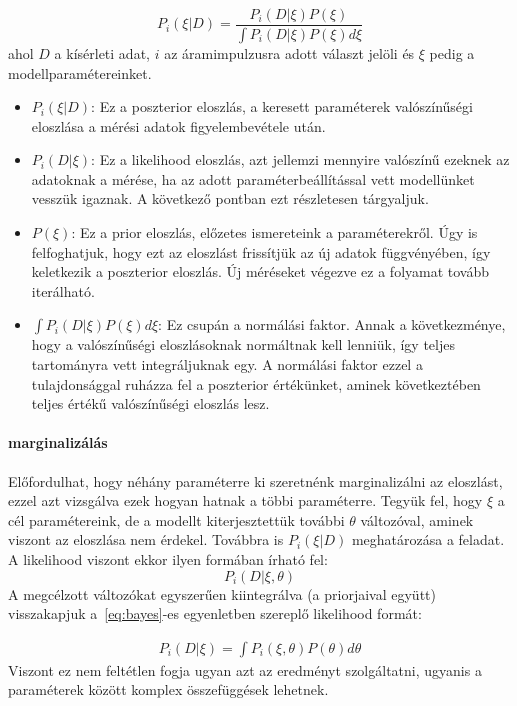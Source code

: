 \begin{equation}\label{eq:bayes}
P_i(\xi|D) = \dfrac{P_i(D|\xi)P(\xi)}{\int P_i(D|\xi)P(\xi)d\xi}
\end{equation}
ahol $D$ a kísérleti adat, $i$ az áramimpulzusra adott választ jelöli és $\xi$ pedig a modellparamétereinket.
\begin{itemize}
	\item $P_i(\xi|D)$: Ez a poszterior eloszlás, a keresett paraméterek valószínűségi eloszlása a mérési adatok figyelembevétele után.
	\item $P_i(D|\xi)$: Ez a likelihood eloszlás, azt jellemzi mennyire valószínű ezeknek az adatoknak a mérése, ha az adott paraméterbeállítással vett modellünket vesszük igaznak. A következő pontban ezt részletesen tárgyaljuk.
	\item $P(\xi)$: Ez a prior eloszlás, előzetes ismereteink a paraméterekről. Úgy is felfoghatjuk, hogy ezt az eloszlást frissítjük az új adatok függvényében, így keletkezik a poszterior eloszlás. Új méréseket végezve ez a folyamat tovább iterálható.
	\item $\int P_i(D|\xi)P(\xi)d\xi$: Ez csupán a normálási faktor. Annak a következménye, hogy a valószínűségi eloszlásoknak normáltnak kell lenniük, így teljes tartományra vett integráljuknak egy. A normálási faktor ezzel a tulajdonsággal ruházza fel a poszterior értékünket, aminek következtében teljes értékű valószínűségi eloszlás lesz.
\end{itemize}

\paragraph{marginalizálás}
Előfordulhat, hogy néhány paraméterre ki szeretnénk marginalizálni az eloszlást, ezzel azt vizsgálva ezek hogyan hatnak a többi paraméterre. Tegyük fel, hogy $\xi$ a cél paramétereink, de a modellt kiterjesztettük további $\theta$ változóval, aminek viszont az eloszlása nem érdekel. Továbbra is $P_i(\xi|D)$ meghatározása a feladat.  A likelihood viszont ekkor ilyen formában írható fel:
\[
P_i(D|\xi, \theta)
\]
A megcélzott változókat egyszerűen kiintegrálva (a priorjaival együtt) visszakapjuk a~\ref{eq:bayes}-es egyenletben szereplő likelihood formát:

\begin{eqnarray}\label{eq:marginalize}
P_i(D|\xi) = \int P_i(\xi, \theta)P(\theta)d\theta
\end{eqnarray}
Viszont ez nem feltétlen fogja ugyan azt az eredményt szolgáltatni, ugyanis a paraméterek között komplex összefüggések lehetnek.

